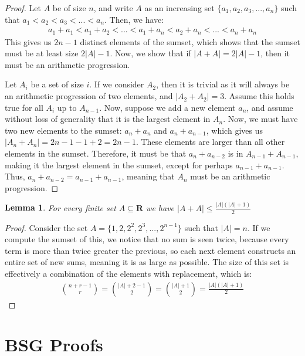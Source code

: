 \documentclass{article}
\newtheorem{lemma}{Lemma}
\begin{document}
\begin{proof}
Let $A$ be of size $n$, and write $A$ as an increasing set $\{a_1, a_2, a_3, ..., a_n\}$ such that $a_1 < a_2 < a_3 < ... < a_n$. Then, we have:
\begin{align*}
    a_1 + a_1 < a_1 + a_2 < ... < a_1 + a_n < a_2 + a_n < ... < a_n + a_n
\end{align*}
This gives us $2n-1$ distinct elements of the sumset, which shows that the sumset must be at least size $2|A|-1$. Now, we show that if $|A+A| = 2|A|-1$, then it must be an arithmetic progression. 

Let $A_i$ be a set of size $i$. If we consider $A_2$, then it is trivial as it will always be an arithmetic progression of two elements, and $|A_2 + A_2| = 3$. Assume this holds true for all $A_i$ up to $A_{n-1}$. Now, suppose we add a new element $a_n$, and assume without loss of generality that it is the largest element in $A_n$. Now, we must have two new elements to the sumset: $a_n + a_n$ and $a_n + a_{n-1}$, which gives us $|A_n + A_n| = 2{n-1}-1 + 2 = 2n-1$. These elements are larger than all other elements in the sumset. Therefore, it must be that $a_n + a_{n-2}$ is in $A_{n-1} + A_{n-1}$, making it the largest element in the sumset, except for perhaps $a_{n-1} + a_{n-1}$. Thus, $a_n + a_{n-2} = a_{n-1} + a_{n-1}$, meaning that $A_{n}$ must be an arithmetic progression.
\end{proof}

\begin{lemma}
\label{Largest sumset}
For every finite set $A \subseteq \mathbf{R}$ we have $|A+A| \leq \frac{|A|(|A| + 1)}{2}$
\end{lemma}

\begin{proof}
Consider the set $A = \{1,2,2^2,2^3,...,2^{n-1}\}$ such that $|A| = n$. If we compute the sumset of this, we notice that no sum is seen twice, because every term is more than twice greater the previous, so each next element constructs an entire set of new sums, meaning it is as large as possible. The size of this set is effectively a combination of the elements with replacement, which is:
\begin{align*}
    \binom{n+r-1}{r} = \binom{|A|+2-1}{2} = \binom{|A|+1}{2} = \frac{|A|(|A| + 1)}{2}
\end{align*}
\end{proof}

\section{BSG Proofs}
\label{sec:bsg}
\end{document}
